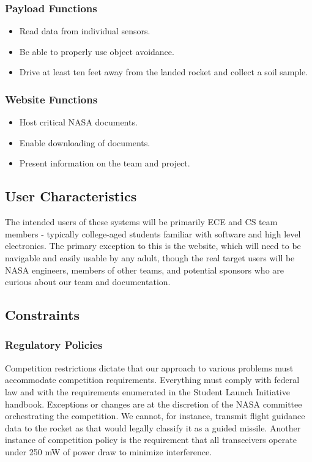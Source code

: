 \documentclass[onecolumn, draftclsnofoot, 10pt, compsoc]{IEEEtran}
\begin{document}
\subsubsection{Payload Functions} \begin{itemize}
\item Read data from individual sensors.
\item Be able to properly use object avoidance. 
\item Drive at least ten feet away from the landed rocket and collect a soil sample. \\
\end{itemize}

\subsubsection{Website Functions} \begin{itemize}
\item Host critical NASA documents. 
\item Enable downloading of documents.
\item Present information on the team and project.
\end{itemize}

\subsection{User Characteristics}
The intended users of these systems will be primarily ECE and CS team members - typically college-aged students familiar with software and high level electronics. The primary exception to this is the website, which will need to be navigable and easily usable by any adult, though the real target users will be NASA engineers, members of other teams, and potential sponsors who are curious about our team and documentation.

\subsection{Constraints}
\subsubsection{Regulatory Policies}
Competition restrictions dictate that our approach to various problems must accommodate competition requirements. Everything must comply with federal law and with the requirements enumerated in the Student Launch Initiative handbook. Exceptions or changes are at the discretion of the NASA committee orchestrating the competition. We cannot, for instance, transmit flight guidance data to the rocket as that would legally classify it as a guided missile. Another instance of competition policy is the requirement that all transceivers operate under 250 mW of power draw to minimize interference.
\end{document}
